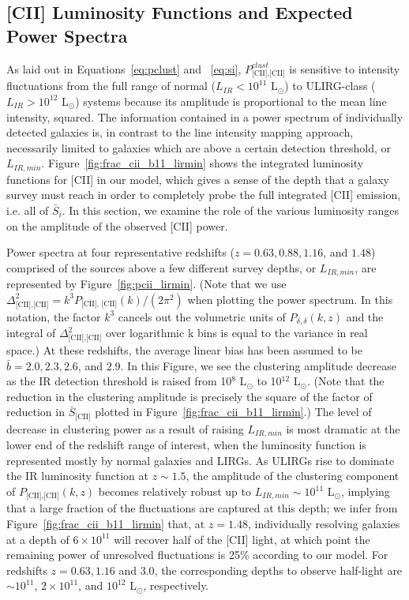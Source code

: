 \documentclass[iop]{emulateapj}
\begin{document}
\subsection{[CII] Luminosity Functions and Expected Power Spectra}

As laid out in Equations~\ref{eq:pclust} and ~\ref{eq:si}, $P_{\textrm{[CII],[CII]}}^{clust}$ is sensitive to intensity fluctuations from the full range of normal ($L_{IR} < 10^{11}$ L$_{\odot}$) to ULIRG-class ($L_{IR} > 10^{12}$ L$_{\odot}$) systems because its amplitude is proportional to the mean line intensity, squared. The information contained in a power spectrum of individually detected galaxies is, in contrast to the line intensity mapping approach, necessarily limited to galaxies which are above a certain detection threshold, or $L_{IR,min}$. Figure~\ref{fig:frac_cii_b11_lirmin} shows the integrated luminosity functions for [CII] in our model, which gives a sense of the depth that a galaxy survey must reach in order to completely probe the full integrated [CII] emission, i.e. all of $\bar{S}_i$. In this section, we examine the role of the various luminosity ranges on the amplitude of the observed [CII] power.  

Power spectra at four representative redshifts ($z = 0.63, 0.88, 1.16$, and $1.48$) comprised of the sources above a few different survey depths, or  $L_{IR, min}$, are represented by Figure~\ref{fig:pcii_lirmin}. (Note that we use  $\Delta_{\textrm{[CII],[CII]}}^2 = k^3 P_{\textrm{[CII], [CII]}}(k)/(2\pi^2)$ when plotting the power spectrum. In this notation, the factor $k^3$ cancels out the volumetric units of $P_{\delta,\delta}(k,z)$ and the integral of $\Delta_{\textrm{[CII],[CII]}}^2$ over logarithmic k bins is equal to the variance in real space.) At these redshifts, the average linear bias has been assumed to be $\bar{b} = 2.0, 2.3, 2.6$, and $2.9$. In this Figure, we see the clustering amplitude decrease as the IR detection threshold is raised from 10$^{8}$ L$_{\odot}$ to 10$^{12}$ L$_{\odot}$.  (Note that the reduction in the clustering amplitude is precisely the square of the factor of reduction in $\bar{S}_{\textrm{[CII]}}$ plotted in Figure~\ref{fig:frac_cii_b11_lirmin}.) The level of decrease in clustering power as a result of raising $L_{IR,min}$ is most dramatic at the lower end of the redshift range of interest, when the luminosity function is represented mostly by normal galaxies and LIRGs. As ULIRGs rise to dominate the IR luminosity function at $z\sim1.5$, the amplitude of the clustering component of $P_{\textrm{[CII],[CII]}}(k,z)$ becomes relatively robust up to $L_{IR,min} \sim 10^{11}$ L$_{\odot}$, implying that a large fraction of the fluctuations are captured at this depth; we infer from Figure~\ref{fig:frac_cii_b11_lirmin} that, at $z = 1.48$, individually resolving galaxies at a depth of $6\times10^{11}$ will recover half of the [CII] light, at which point the remaining power of unresolved fluctuations is 25\% according to our model. For redshifts $z=0.63, 1.16$ and $3.0$, the corresponding depths to observe half-light are $\sim 10^{11}$, $2\times10^{11}$, and $10^{12}$ L$_{\odot}$, respectively. 
\end{document}
